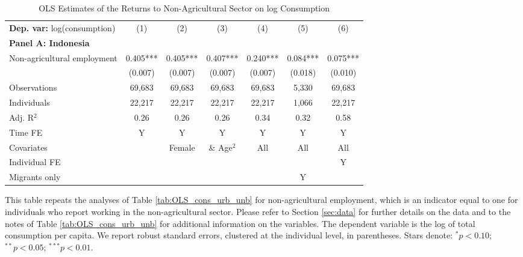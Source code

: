 \begin{table}[htbp] \centering \begin{threeparttable}
 \caption{OLS Estimates of the Returns to Non-Agricultural Sector on log Consumption} 
 \label{tab:OLS_cons_nonag_unb} 
\begin{tabular}{l cccccc} \toprule  \textbf{Dep. var:}  log(consumption) 
                    &\multicolumn{1}{c}{(1)}   &\multicolumn{1}{c}{(2)}   &\multicolumn{1}{c}{(3)}   &\multicolumn{1}{c}{(4)}   &\multicolumn{1}{c}{(5)}   &\multicolumn{1}{c}{(6)}   \\
\textbf{Panel A: Indonesia} \\
Non-agricultural employment&       0.405***&       0.405***&       0.407***&       0.240***&       0.084***&       0.075***\\
                    &     (0.007)   &     (0.007)   &     (0.007)   &     (0.007)   &     (0.018)   &     (0.010)   \\
\addlinespace
Observations        &      69,683   &      69,683   &      69,683   &      69,683   &       5,330   &      69,683   \\
Individuals         &      22,217   &      22,217   &      22,217   &      22,217   &       1,066   &      22,217   \\
Adj. R$^{2}$        &        0.26   &        0.26   &        0.26   &        0.34   &        0.32   &        0.58   \\
\cmidrule{2 -7} Time FE & Y & Y & Y & Y & Y & Y \\ Covariates & & Female & \& Age$^2$ & All & All & All \\ Individual FE & & & & & & Y \\ Migrants only & & & & & Y & \\ \bottomrule \end{tabular} \begin{tablenotes}[flushleft] \footnotesize \item{This table repeats the analyses of Table \ref{tab:OLS_cons_urb_unb}  for non-agricultural employment, which is an indicator equal to one for individuals who report working in the non-agricultural sector. Please refer to Section \ref{sec:data} for further details on the data and to the notes of Table \ref{tab:OLS_cons_urb_unb} for additional information on the variables. The dependent variable is the log of total consumption per capita. We report robust standard errors, clustered at the individual level, in parentheses. Stars denote: $^{*} p<0.10$; $^{**} p<0.05$; $^{***} p<0.01$.} \end{tablenotes} \end{threeparttable} \end{table}
